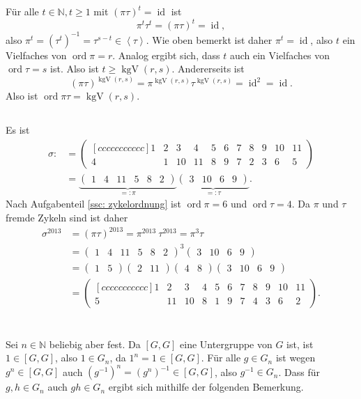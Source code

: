 \documentclass[a4paper,10pt]{article}
\theoremstyle{definition}
\newcommand{\N}{\mathbb{N}}
\newcommand{\id}{\operatorname{id}}
\newcommand{\ord}{\operatorname{ord}}
\newcommand{\kgV}{\operatorname{kgV}}
\newcommand{\vect}[1]{\begin{pmatrix}#1\end{pmatrix}}
\newcommand{\gen}[1]{\left\langle#1\right\rangle}
\begin{document}
Für alle $t \in \N, t \geq 1$ mit $(\pi \tau)^t = \id$ ist
\[
 \pi^t \tau^t = (\pi \tau)^t = \id,
\]
also $\pi^t = (\tau^t)^{-1} = \tau^{s-t} \in \gen{\tau}$. Wie oben bemerkt ist daher $\pi^t = \id$, also $t$ ein Vielfaches von $\ord \pi = r$. Analog ergibt sich, dass $t$ auch ein Vielfaches von $\ord \tau = s$ ist. Also ist $t \geq \kgV(r,s)$. Andererseits ist
\[
 (\pi \tau)^{\kgV(r,s)} = \pi^{\kgV(r,s)} \tau^{\kgV(r,s)} = \id^2 = \id.
\]
Also ist $\ord \pi\tau = \kgV(r,s)$.


\subsection{}
Es ist
\begin{align*}
 \sigma :&=
 \begin{pmatrix}[ccccccccccc]
  1 & 2 &  3 &  4 & 5 & 6 & 7 & 8 & 9 & 10 & 11\\
  4 & 1 & 10 & 11 & 8 & 9 & 7 & 2 & 3 &  6 & 5
 \end{pmatrix} \\
 &= \underbrace{\vect{1 & 4 & 11 & 5 & 8 & 2}}_{=: \pi} \underbrace{\vect{3 & 10 & 6 & 9}}_{=: \tau}.
\end{align*}
Nach Aufgabenteil \ref{ssc: zykelordnung} ist $\ord \pi = 6$ und $\ord \tau = 4$.
Da $\pi$ und $\tau$ fremde Zykeln sind ist daher
\begin{align*}
 \sigma^{2013}
 &= (\pi \tau)^{2013}
 = \pi^{2013}\ \tau^{2013}
 = \pi^3 \tau \\
 &= \vect{1 & 4 & 11 & 5 & 8 & 2}^3 \vect{3 & 10 & 6 & 9} \\
 &= \vect{1 & 5} \vect{2 & 11} \vect{4 & 8} \vect{3 & 10 & 6 & 9} \\
 &=
 \begin{pmatrix}[ccccccccccc]
  1 &  2 &  3 & 4 & 5 & 6 & 7 & 8 & 9 & 10 & 11\\
  5 & 11 & 10 & 8 & 1 & 9 & 7 & 4 & 3 &  6 &  2
 \end{pmatrix}.
\end{align*}





\section{}





\section{}
Sei $n \in \N$ beliebig aber fest. Da $[G,G]$ eine Untergruppe von $G$ ist, ist $1 \in [G,G]$, also $1 \in G_n$, da $1^n = 1 \in [G,G]$. Für alle $g \in G_n$ ist wegen $g^n \in [G,G]$ auch $(g^{-1})^n = (g^n)^{-1} \in [G,G]$, also $g^{-1} \in G_n$. Dass für $g,h \in G_n$ auch $gh \in G_n$ ergibt sich mithilfe der folgenden Bemerkung.
\end{document}
